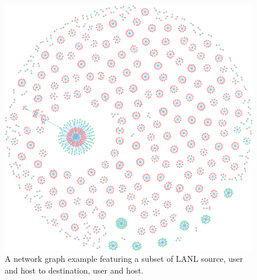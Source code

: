 \documentclass[sigconf]{acmart}
\begin{document}
\begin{figure}
  \begin{center}
    \includegraphics[scale=0.35]{graph-deathstar1.png}
    \caption{A network graph example featuring a subset of LANL source, user and host to destination, user and host.}
  \end{center}
  \label{figure:DeathStar1}
\end{figure}

\end{document}
